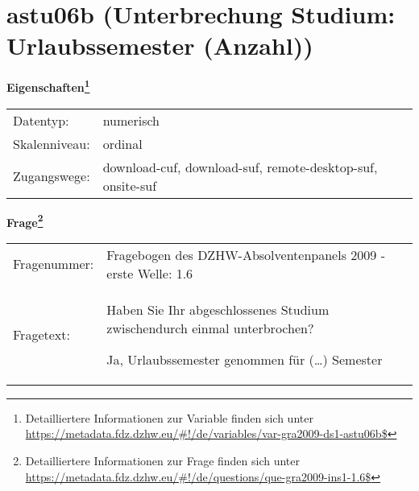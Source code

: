
    \setcounter{footnote}{0}

    \vspace*{-1.8cm}
	\section{astu06b (Unterbrechung Studium: Urlaubssemester (Anzahl))}
	\label{section:astu06b}



    \vspace*{0.5cm}
    \noindent\textbf{Eigenschaften\footnote{Detailliertere Informationen zur Variable finden sich unter
		\url{https://metadata.fdz.dzhw.eu/\#!/de/variables/var-gra2009-ds1-astu06b$}}}\\
	\begin{tabularx}{\hsize}{@{}lX}
	Datentyp: & numerisch \\
	Skalenniveau: & ordinal \\
	Zugangswege: &
	  download-cuf, 
	  download-suf, 
	  remote-desktop-suf, 
	  onsite-suf
 \\
    \end{tabularx}



				\vspace*{0.5cm}
                \noindent\textbf{Frage\footnote{Detailliertere Informationen zur Frage finden sich unter
		              \url{https://metadata.fdz.dzhw.eu/\#!/de/questions/que-gra2009-ins1-1.6$}}}\\
				\begin{tabularx}{\hsize}{@{}lX}
					Fragenummer: &
					  Fragebogen des DZHW-Absolventenpanels 2009 - erste Welle:
					  1.6
 \\
					Fragetext: & Haben Sie Ihr abgeschlossenes Studium zwischendurch einmal unterbrochen?\par  Ja, Urlaubssemester genommen für (…) Semester \\
				\end{tabularx}





